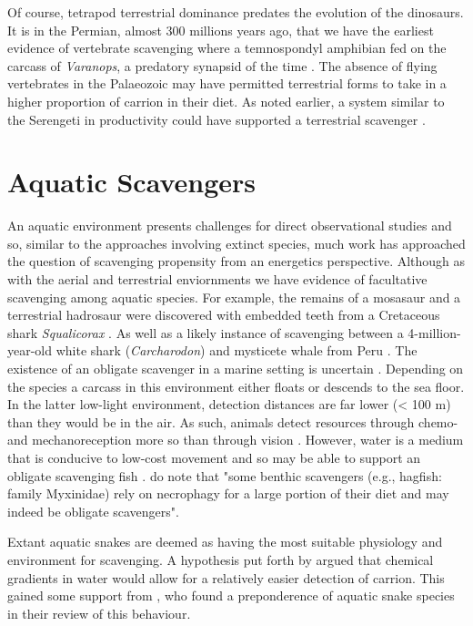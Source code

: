 \documentclass[a4paper,12pt]{article}
\begin{document}
Of course, tetrapod terrestrial dominance predates the evolution of the dinosaurs. It is in the Permian, almost 300 millions years ago, that we have the earliest evidence of vertebrate scavenging where a temnospondyl amphibian fed on the carcass of \textit{Varanops}, a predatory synapsid of the time \citep{reisz2006articulated}. The absence of flying vertebrates in the Palaeozoic may have permitted terrestrial forms to take in a higher proportion of carrion in their diet. As noted earlier, a system similar to the Serengeti in productivity could have supported a terrestrial scavenger \citep{ruxton2004obligate}. 

\section*{Aquatic Scavengers} 
An aquatic environment presents challenges for direct observational studies and so, similar to the approaches involving extinct species, much work has approached the question of scavenging propensity from an energetics perspective. Although as with the aerial and terrestrial enviornments we have evidence of facultative scavenging among aquatic species. For example, the remains of a mosasaur and a terrestrial hadrosaur were discovered with embedded teeth from a Cretaceous shark \textit{Squalicorax} \citep{schwimmer1997scavenging}. As well as a likely instance of scavenging between a 4-million-year-old white shark (\textit{Carcharodon}) and mysticete whale from Peru \citep{ehret2009caught}.
The existence of an obligate scavenger in a marine setting is uncertain \citep{britton1994marine,smith2003ecology,ruxton2004energetic,ruxton2005searching}. Depending on the species a carcass in this environment either floats or descends to the sea floor. In the latter low-light environment, detection distances are far lower (< 100 m) than they would be in the air. As such, animals detect resources through chemo- and mechanoreception more so than through vision \citep{ruxton2004energetic}. However, water is a medium that is conducive to low-cost movement \citep{tucker1975energetic} and so may be able to support an obligate scavenging fish \citep{ruxton2004energetic,ruxton2005searching}. \cite{benbow2015introduction} do note that "some benthic scavengers (e.g., hagfish: family Myxinidae) rely on necrophagy for a large portion of their diet and may indeed be obligate scavengers". 

Extant aquatic snakes are deemed as having the most suitable physiology and environment for scavenging. A hypothesis put forth by \cite{sazima1990necrofagia} argued that chemical gradients in water would allow for a relatively easier detection of carrion. This gained some support from \cite{devault2002scavenging}, who found a preponderence of aquatic snake species in their review of this behaviour. 
\end{document}
